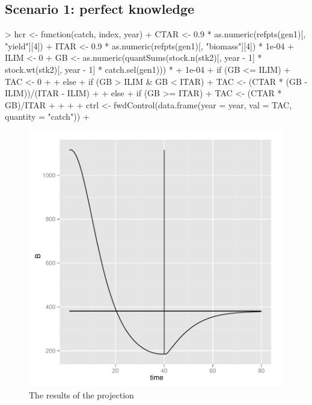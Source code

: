 \documentclass[a4paper]{article}
\begin{document}
\subsection{Scenario 1: perfect knowledge}
\begin{Schunk}
\begin{Sinput}
> hcr <- function(catch, index, year) {
+     CTAR <- 0.9 * as.numeric(refpts(gen1)[, "yield"][4])
+     ITAR <- 0.9 * as.numeric(refpts(gen1)[, "biomass"][4]) * 1e-04
+     ILIM <- 0
+     GB <- as.numeric(quantSums(stock.n(stk2)[, year - 1] * stock.wt(stk2)[, year - 1] * catch.sel(gen1))) * 
+         1e-04
+     if (GB <= ILIM) {
+         TAC <- 0
+     }
+     else {
+         if (GB > ILIM & GB < ITAR) {
+             TAC <- (CTAR * (GB - ILIM))/(ITAR - ILIM)
+         }
+         else {
+             if (GB >= ITAR) {
+                 TAC <- (CTAR * GB)/ITAR
+             }
+         }
+     }
+     ctrl <- fwdControl(data.frame(year = year, val = TAC, quantity = "catch"))
+ }
\end{Sinput}
\end{Schunk}

\begin{figure}
\includegraphics{script-hcr_plot_sc1}
\caption{The results of the projection}
\label{fig:hcr_proj_biomass}
\end{figure}
\end{document}
